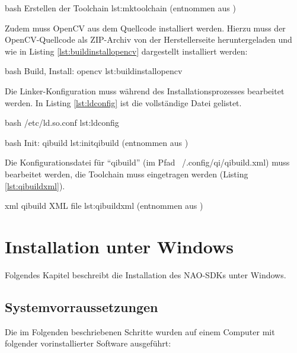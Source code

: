                     {bash}
                    {Erstellen der Toolchain}
                    {lst:mktoolchain}
        (entnommen aus \cite[S. 7]{projss15})

        Zudem muss OpenCV aus dem Quellcode installiert werden.
        Hierzu muss der OpenCV-Quellcode als ZIP-Archiv von der Herstellerseite
        heruntergeladen und wie in Listing \ref{lst:buildinstallopencv}
        dargestellt installiert werden:

                    {bash}
                    {Build, Install: opencv}
                    {lst:buildinstallopencv}

        Die Linker-Konfiguration muss während des Installationsprozesses
        bearbeitet werden.
        In Listing \ref{lst:ldconfig} ist die vollständige Datei gelistet.

                    {bash}
                    {/etc/ld.so.conf}
                    {lst:ldconfig}


                    {bash}
                    {Init: qibuild}
                    {lst:initqibuild}
        (entnommen aus \cite[S. 8, f.]{projss15})

        Die Konfigurationsdatei für ``qibuild''
        (im Pfad ~/.config/qi/qibuild.xml) muss bearbeitet werden, die
        Toolchain muss eingetragen werden (Listing \ref{lst:qibuildxml}).

                    {xml}
                    {qibuild XML file}
                    {lst:qibuildxml}
        (entnommen aus \cite[S. 8]{projss15})

    \section{Installation unter Windows}

        Folgendes Kapitel beschreibt die Installation des NAO-SDKs unter
        Windows.

        \subsection{Systemvorraussetzungen}

            Die im Folgenden beschriebenen Schritte wurden auf einem Computer
            mit folgender vorinstallierter Software ausgeführt:

